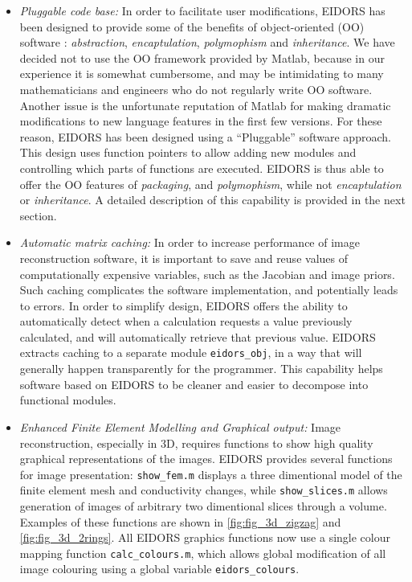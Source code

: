 \documentclass[12pt]{iopart}
\begin{document}
\begin{itemize}
  \item {\em Pluggable code base:}
In order to facilitate user modifications, EIDORS
has been designed to provide some of the benefits of
object-oriented (OO) software \cite{Gamma_etal_1995}:
{\em abstraction}, {\em encaptulation}, 
{\em polymophism} and {\em inheritance}.
We have decided not to
use the OO framework provided by Matlab, because
in our experience it is somewhat cumbersome,
and may be intimidating
to many mathematicians and engineers who do not 
regularly write OO software.
Another issue is the unfortunate reputation of
Matlab for making dramatic modifications to new
language features in the first few versions.
For these reason, EIDORS has been designed using
a  ``Pluggable'' software approach.
This design uses function
pointers to allow adding new modules and controlling
which parts of functions are executed.
EIDORS is thus able to offer the OO features 
of {\em packaging}, and {\em polymophism}, while
not {\em encaptulation} or {\em inheritance}.
A detailed description of this capability is
provided in the next section.

  \item {\em Automatic matrix caching:}
In order to increase
performance of image reconstruction software, it is important to save
and reuse values of 
computationally expensive variables, such as the Jacobian and image priors.
Such caching complicates the software implementation, and
potentially leads to errors. In order to simplify design, EIDORS
offers the ability to automatically detect when a calculation
requests a value previously calculated, and will automatically
retrieve that previous value.
EIDORS extracts caching to a separate module {\tt eidors\_obj},
in a way that will generally happen transparently for the
programmer. This capability helps software based on EIDORS
to be cleaner and easier to decompose into functional
modules.


  \item {\em Enhanced Finite Element Modelling and Graphical output:}
Image reconstruction, especially in 3D, requires functions
to show high quality graphical representations of the images.
EIDORS provides several functions for image presentation:
{\tt show\_fem.m} displays a three dimentional model of the
finite element mesh and conductivity changes, while
{\tt show\_slices.m} allows generation of images of arbitrary
two dimentional slices through a volume. Examples of these
functions are shown in \ref{fig:fig_3d_zigzag} and \ref{fig:fig_3d_2rings}.
All EIDORS graphics functions now use a single colour
mapping function {\tt calc\_colours.m}, which allows
global modification of all image colouring using a
global variable {\tt eidors\_colours}.



\end{itemize}
\end{document}
